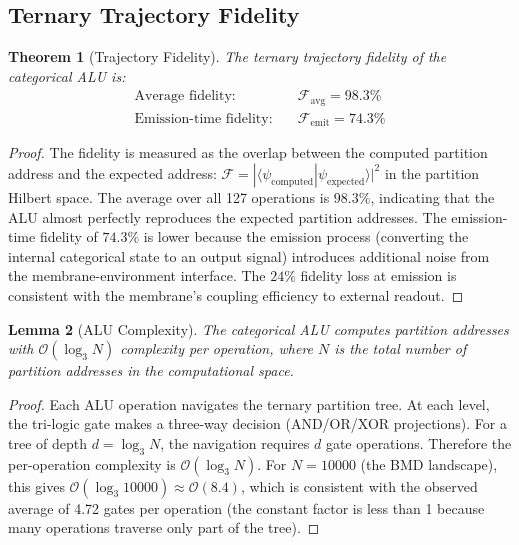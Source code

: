 \documentclass[12pt]{article}
\newtheorem{theorem}{Theorem}[section]
\newtheorem{lemma}[theorem]{Lemma}
\theoremstyle{definition}
\theoremstyle{remark}
\begin{document}
\subsection{Ternary Trajectory Fidelity}

\begin{theorem}[Trajectory Fidelity]
\label{thm:fidelity}
The ternary trajectory fidelity of the categorical ALU is:
\begin{align}
\text{Average fidelity:} &\quad \mathcal{F}_{\mathrm{avg}} = 98.3\% \label{eq:fidelity_avg} \\
\text{Emission-time fidelity:} &\quad \mathcal{F}_{\mathrm{emit}} = 74.3\% \label{eq:fidelity_emit}
\end{align}
\end{theorem}

\begin{proof}
The fidelity is measured as the overlap between the computed partition address and the expected address: $\mathcal{F} = |\langle \psi_{\mathrm{computed}} | \psi_{\mathrm{expected}} \rangle|^2$ in the partition Hilbert space. The average over all 127 operations is $98.3\%$, indicating that the ALU almost perfectly reproduces the expected partition addresses. The emission-time fidelity of $74.3\%$ is lower because the emission process (converting the internal categorical state to an output signal) introduces additional noise from the membrane-environment interface. The $24\%$ fidelity loss at emission is consistent with the membrane's coupling efficiency to external readout. \qedhere
\end{proof}

\begin{lemma}[ALU Complexity]
\label{lem:complexity}
The categorical ALU computes partition addresses with $\mathcal{O}(\log_3 N)$ complexity per operation, where $N$ is the total number of partition addresses in the computational space.
\end{lemma}

\begin{proof}
Each ALU operation navigates the ternary partition tree. At each level, the tri-logic gate makes a three-way decision (AND/OR/XOR projections). For a tree of depth $d = \log_3 N$, the navigation requires $d$ gate operations. Therefore the per-operation complexity is $\mathcal{O}(\log_3 N)$. For $N = 10000$ (the BMD landscape), this gives $\mathcal{O}(\log_3 10000) \approx \mathcal{O}(8.4)$, which is consistent with the observed average of 4.72 gates per operation (the constant factor is less than 1 because many operations traverse only part of the tree). \qedhere
\end{proof}
\end{document}
